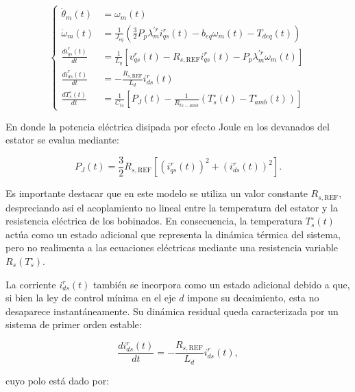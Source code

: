 \documentclass[10pt,a4paper]{article}
\begin{document}
\begin{equation}
	\left\{
	\begin{aligned}
		\dot{\theta}_m(t) &= \omega_m(t)
		\\[2mm]
		\dot{\omega}_m(t) &=
		\frac{1}{J_{eq}}
		\left(
		\frac{3}{2}P_p\lambda_m^{\prime r}i_{qs}^{r}(t)
		-
		b_{eq}\omega_m(t)
		-
		T_{deq}(t)
		\right)
		\\[2mm]
		\frac{di_{qs}^{r}(t)}{dt} &=
		\frac{1}{L_q}
		\left[
		v_{qs}^{r}(t)
		-
		R_{s,\mathrm{REF}}i_{qs}^{r}(t)
		-
		P_p\lambda_m^{\prime r}\omega_m(t)
		\right]
		\\[2mm]
		\frac{di_{ds}^{r}(t)}{dt} &=
		-\frac{R_{s,\mathrm{REF}}}{L_d}i_{ds}^{r}(t)
		\\[2mm]
		\frac{dT_s^{\circ}(t)}{dt} &=
		\frac{1}{C_{ts}}
		\left[
		P_J(t)
		-
		\frac{1}{R_{ts-amb}}
		\left(
		T_s^{\circ}(t)-T_{amb}^{\circ}(t)
		\right)
		\right]
	\end{aligned}
	\right.
	\label{eq:modelo_lti_aumentado}
\end{equation}

En donde la potencia eléctrica disipada por efecto Joule en los devanados del estator se evalua mediante:

\begin{equation}
	P_J(t)=
	\frac{3}{2}R_{s,\mathrm{REF}}
	\left[
	\left(i_{qs}^{r}(t)\right)^2+
	\left(i_{ds}^{r}(t)\right)^2
	\right].
	\label{eq:perdidas_joule_lti_aumentado}
\end{equation}

Es importante destacar que en este modelo se utiliza un valor constante $R_{s,\mathrm{REF}}$, despreciando asi el acoplamiento no lineal entre la temperatura del estator y la resistencia eléctrica de los bobinados. 
En consecuencia, la temperatura $T_s^{\circ}(t)$ actúa como un estado adicional que representa la dinámica térmica del sistema, 
pero no realimenta a las ecuaciones eléctricas mediante una resistencia variable $R_s(T_s^{\circ})$.

La corriente $i_{ds}^{r}(t)$ también se incorpora como un estado adicional debido a que, si bien la ley de control mínima en el eje $d$ impone su decaimiento, 
esta no desaparece instantáneamente. Su dinámica residual queda caracterizada por un sistema de primer orden estable:

\begin{equation*}
\frac{di_{ds}^{r}(t)}{dt}
=
-\frac{R_{s,\mathrm{REF}}}{L_d}i_{ds}^{r}(t),
\end{equation*}

cuyo polo está dado por:
\end{document}
